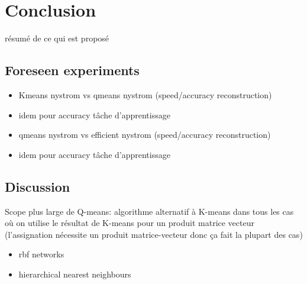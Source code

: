 \section{Conclusion}
\label{sec:conclusion}

résumé de ce qui est proposé

\subsection{Foreseen experiments}

\begin{itemize}
 \item Kmeans nystrom vs qmeans nystrom (speed/accuracy reconstruction)
\item idem pour accuracy tâche d'apprentissage
\item qmeans nystrom vs efficient nystrom (speed/accuracy reconstruction)
\item idem pour accuracy tâche d'apprentissage
\end{itemize}

\subsection{Discussion}

Scope plus large de Q-means: algorithme alternatif à K-means dans tous les cas où on utilise le résultat de K-means pour un produit matrice vecteur (l'assignation nécessite un produit matrice-vecteur donc ça fait la plupart des cas)
\begin{itemize}
 \item rbf networks
 \item hierarchical nearest neighbours
\end{itemize}

